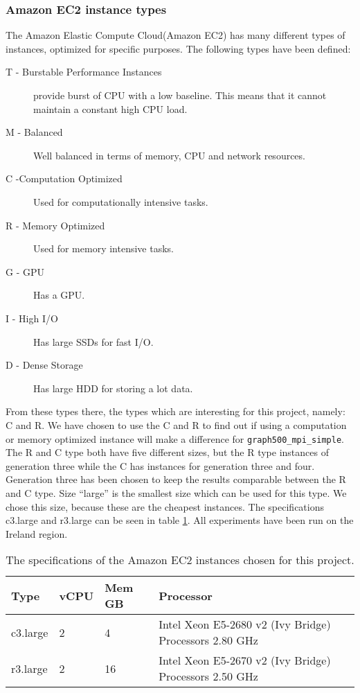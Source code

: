 \subsubsection{Amazon EC2 instance types}
\label{hw:Amazon}
The Amazon Elastic Compute Cloud(Amazon EC2) has many different types of instances, optimized for specific purposes\cite{amazon-instances}. The following types have been defined:
\begin{description}
\item[T - Burstable Performance Instances] provide burst of CPU with a low baseline. This means that it cannot maintain a constant high CPU load.
\item[M - Balanced] Well balanced in terms of memory, CPU and network resources.
\item[C -Computation Optimized] Used for computationally intensive tasks.
\item[R - Memory Optimized] Used for memory intensive tasks.
\item[G - GPU] Has a GPU.
\item[I - High I/O] Has large SSDs for fast I/O.
\item[D - Dense Storage] Has large HDD for storing a lot data.
\end{description}
From these types there, the types which are interesting for this project, namely: C and R. We have chosen to use the C and R to find out if using a computation or memory optimized instance will make a difference for \texttt{graph500\_mpi\_simple}.
The R and C type both have five different sizes, but the R type instances of generation three while the C has instances for generation three and four. Generation three has been chosen to keep the results comparable between the R and C type. Size ``large'' is the smallest size which can be used for this type. We chose this size, because these are the cheapest instances. The specifications c3.large and r3.large can be seen in table \ref{tab:specs-amazon}. All experiments have been run on the Ireland region.

\begin{table}[!h]
\begin{center}
\begin{tabular}{|l|l|l|l|}
\hline
Type & vCPU & Mem GB & Processor \\ \hline
c3.large & 2 & 4 & Intel Xeon E5-2680 v2 (Ivy Bridge) Processors 2.80 GHz \\ \hline
r3.large & 2 & 16 & Intel Xeon E5-2670 v2 (Ivy Bridge) Processors 2.50 GHz \\ \hline
\end{tabular}
\end{center}
\caption{The specifications of the Amazon EC2 instances chosen for this project.}
\label{tab:specs-amazon}
\end{table}
